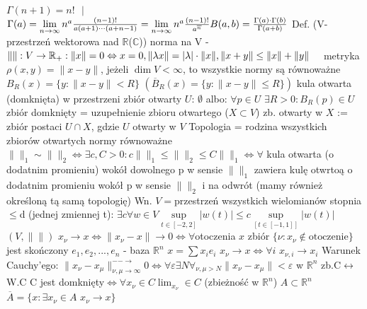 \documentclass{article}
\newcommand{\norma}[1]{\lVert{#1}\rVert}
\begin{document}
$\Gamma(n+1)=n!$ $ $ $|$ $ $ $\Gamma(a)=\lim\limits_{n\rightarrow\infty}n^a\frac{(n-1)!}{a(a+1)\cdots(a+n-1)}=\lim\limits_{n\rightarrow\infty}n^a\frac{(n-1)!}{a^{\overline{n}}}\newline
B(a,b)=\frac{\Gamma(a)\cdot\Gamma(b)}{\Gamma(a+b)}$
\newpage
Def. (V-przestrzeń wektorowa nad $\mathbb{R}$($\mathbb{C}$)) norma na V - $\norma{ }:V\rightarrow\mathbb{R_+}:\norma{x}=0\Leftrightarrow x=0,
\norma{\lambda x}=|\lambda|\cdot\norma{x},\newline\norma{x+y}\le\norma{x}+\norma{y}\quad$ metryka $\rho(x,y)=\norma{x-y}$,
jeżeli $\dim V<\infty$, to wszystkie normy są równoważne\newline
$B_R(x)=\{y:\norma{x-y}<R\}$ $(\overline{B}_R(x)=\{y:\norma{x-y}\le R\})$ kula otwarta (domknięta) w przestrzeni\newline
zbiór otwarty $U$: $\emptyset$ albo: $\forall p\in U$ $\exists R>0:B_R(p)\in U$\newline
zbiór domknięty = uzupełnienie zbioru otwartego\newline
($X\subset V$) zb. otwarty w $X$ := zbiór postaci $U\cap X$, gdzie $U$ otwarty w $V$\newline
Topologia = rodzina wszystkich zbiorów otwartych\newline
normy równoważne $\norma{}_1\sim\norma{}_2\Leftrightarrow\exists c,C>0:c\norma{}_1\le\norma{}_2\le C\norma{}_1\Leftrightarrow
\forall$ kula otwarta (o dodatnim promieniu) wokół dowolnego p w sensie $\norma{}_1$ zawiera kulę otwrtoą o dodatnim promieniu wokół p w sensie $\norma{}_2$
i na odwrót (mamy również określoną tą samą topologię)\newline
Wn. $V=$przestrzeń wszystkich wielomianów stopnia$\le$d (jednej zmiennej t): $\exists c\forall w\in V \sup\limits_{t\in[-2,2]}|w(t)|\le c\sup\limits_{[t\in[-1,1]]}|w(t)|$\newline
$(V,\norma{})$ $x_\nu\rightarrow x\Leftrightarrow\norma{x_\nu-x}\rightarrow0\Leftrightarrow\forall$otoczenia $x$ zbiór $\{\nu:x_\nu\notin\text{otoczenie}\}$jest skończony\newline
$e_1,e_2,...,e_n$ - baza $\mathbb{R}^n$ $x=\sum x_ie_i$ $x_\nu\rightarrow x\Leftrightarrow\forall i$ $x_{\nu,i}\rightarrow x_i$\newline
Warunek Cauchy'ego: $\norma{x_\nu-x_\mu}^{--\longrightarrow}_{\nu,\mu\rightarrow\infty}0\Leftrightarrow\forall\varepsilon\exists N\forall_{\nu,\mu>N}\norma{x_\nu-x_\mu}<\varepsilon$
\quad w $\mathbb{R}^n$ zb.C$\leftrightarrow$W.C\newline
C jest domknięty$\Leftrightarrow\forall x_\nu\in C \lim_{x_\nu}\in C$ (zbieżność w $\mathbb{R}^n$) $A\subset\mathbb{R}^n$ $\overline{A}=\{x:\exists x_\nu\in A$ $x_\nu\rightarrow x \}$\newline
\end{document}
